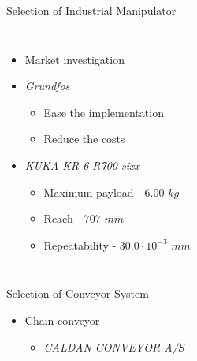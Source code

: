 \begin{frame}{Selection of Industrial Manipulator}
\begin{columns}
    \begin{itemize}
        \item Market investigation
    \vspace{2.5mm}
        \item \textit{Grundfos}
            \begin{itemize}
                \item Ease the implementation
                \item Reduce the costs
            \end{itemize}
    \vspace{2.5mm}
        \item \textit{KUKA KR 6 R700 sixx}
            \begin{itemize}
                \item Maximum payload - $6.00$ $kg$
                \item Reach - $707$ $mm$
                \item Repeatability - $30.0\cdot10^{-3}$ $mm$
            \end{itemize}
    \end{itemize}
\end{columns}
\end{frame}

\begin{frame}{Selection of Conveyor System}
    \begin{itemize}
        \item Chain conveyor
            \begin{itemize}
                \item \textit{CALDAN CONVEYOR A/S}
            \end{itemize}
    \end{itemize}
\vspace{5mm}
\end{frame}


